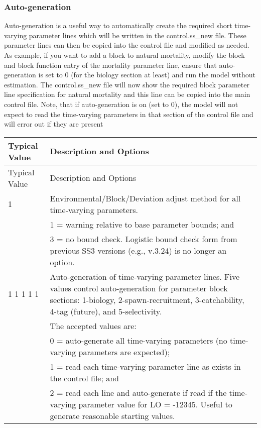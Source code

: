\hypertarget{autogen}{}
\subsubsection{Auto-generation}
Auto-generation is a useful way to automatically create the required short time-varying parameter lines which will be written in the control.ss\_new file. These parameter lines can then be copied into the control file and modified as needed. As example, if you want to add a block to natural mortality, modify the block and block function entry of the mortality parameter line, ensure that auto-generation is set to 0 (for the biology section at least) and run the model without estimation. The control.ss\_new file will now show the required block parameter line specification for natural mortality and this line can be copied into the main control file. Note, that if auto-generation is on (set to 0), the model will not expect to read the time-varying parameters in that section of the control file and will error out if they are present

	
\begin{longtable}{p{0.5cm} p{2cm} p{12.5cm}}
	\hline
	\multicolumn{2}{l}{Typical Value} & Description and Options \Tstrut\Bstrut\\
	\hline
	\endfirsthead

	\hline
	\multicolumn{2}{l}{Typical Value} & Description and Options \Tstrut\Bstrut\\
	\hline
	\endhead

	\hline
	\endfoot

	\endlastfoot

	1 & & Environmental/Block/Deviation adjust method for all time-varying parameters. \Tstrut\\
	  & & 1 = warning relative to base parameter bounds; and \\
	  & & 3 = no bound check. Logistic bound check form from previous SS3 versions (e.g., v.3.24) is no longer an option. \Bstrut\\

	\multicolumn{2}{l}{1 1 1 1 1} & Auto-generation of time-varying parameter lines. Five values control auto-generation for parameter block sections: 1-biology, 2-spawn-recruitment, 3-catchability, 4-tag (future), and 5-selectivity. \\
	& 			& The accepted values are: \\
	& 			& 0 = auto-generate all time-varying parameters (no time-varying parameters are expected); \\
	& 			& 1 = read each time-varying parameter line as exists in the control file; and \\
	&			& 2 = read each line and auto-generate if read if the time-varying parameter value for LO = -12345. Useful to generate reasonable starting values. \Bstrut\\
	\hline
\end{longtable}


